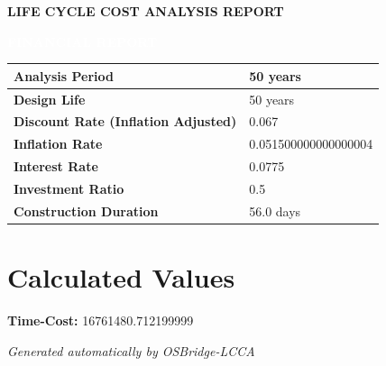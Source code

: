\documentclass[12pt]{article}
\begin{document}
\vspace*{0.6cm}

\begin{center}
\textbf{\fontsize{18pt}{20pt}\selectfont LIFE CYCLE COST ANALYSIS REPORT}
\end{center}

\vspace{0.4cm}

\begin{center}
\colorbox{osgreen}{%
    \parbox{0.8\linewidth}{%
        \centering
        \textcolor{white}{\textbf{FINANCIAL REPORT}}
    }
}
\end{center}

\vspace{0.4cm}

\begin{center}
\begin{tabular}{|p{7cm}|p{5cm}|}
\hline
\textbf{Analysis Period} & 50 years \\ \hline
\textbf{Design Life} & 50 years \\ \hline
\textbf{Discount Rate (Inflation Adjusted)} & 0.067 \\ \hline
\textbf{Inflation Rate} & 0.051500000000000004 \\ \hline
\textbf{Interest Rate} & 0.0775 \\ \hline
\textbf{Investment Ratio} & 0.5 \\ \hline
\textbf{Construction Duration} & 56.0 days \\ \hline
\end{tabular}
\end{center}

\vspace{0.3cm}

\section*{Calculated Values}
\textbf{Time-Cost:} 16761480.712199999

\vfill

{\centering
\textit{Generated automatically by OSBridge-LCCA} \par
}
\end{document}
